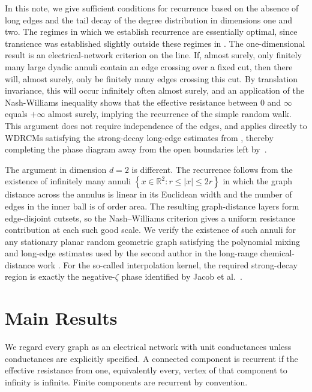 \documentclass[11pt,a4paper]{scrartcl}
\newcommand{\R}{\mathbb{R}}
\newcommand{\1}{\mathbb{1}}
\begin{document}
In this note, we give sufficient conditions for recurrence based on the absence of long edges and the tail decay of the degree distribution in dimensions one and two. The regimes in which we establish recurrence are essentially optimal, since transience was established slightly outside these regimes in \cite{Moench2024, GHMM2022}. The
one-dimensional result is an electrical-network criterion on the line.  If,
almost surely, only finitely many large dyadic annuli contain an edge crossing over a fixed cut, then there will, almost surely, only be finitely many edges crossing this cut. By translation invariance, this will occur infinitely often almost surely, and an application of the Nash-Williams inequality shows that the effective resistance between $0$ and $\infty$ equals $+\infty$ almost surely, implying the recurrence of the simple random walk.
This argument does not require independence of the edges, and applies directly to
WDRCMs satisfying the strong-decay long-edge estimates from
\cite{GracarLuechtrathMoench2025, jacobJahLu2024}, thereby completing the phase diagram away from the open boundaries left by~\cite{GHMM2022,Moench2024,Baeumler2023_recurrence}.


The argument in dimension $d=2$ is different.  The recurrence follows from the existence of
infinitely many annuli $\left\{x \in \R^2 : r \leq |x| \leq 2r\right\}$ in which the graph distance across the
annulus is linear in its Euclidean width and the number of edges in the inner
ball is of order area.  The resulting graph-distance layers form
edge-disjoint cutsets, so the Nash--Williams criterion gives a
uniform resistance contribution at each such good scale.  We verify the existence of such annuli
for any stationary planar random geometric graph satisfying the polynomial
mixing and long-edge estimates used by the second author in the long-range
chemical-distance work \cite{lue2024spatialrandomgraphsweak}.
For the so-called
interpolation kernel, the required strong-decay region is exactly the
negative-\(\zeta\) phase identified by Jacob et al.\
\cite{jacobJahLu2024}.

\section{Main Results}
\label{sec:main-results}

We regard every graph as an electrical network with unit conductances unless
conductances are explicitly specified.  A connected component is recurrent if
the effective resistance from one, equivalently every, vertex of that
component to infinity is infinite.  Finite components are recurrent by
convention.
\end{document}
